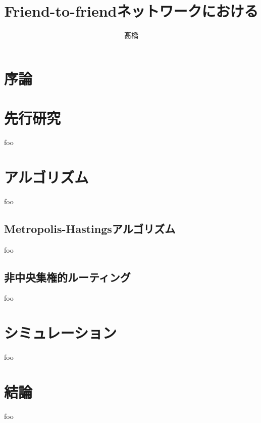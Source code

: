 \documentclass[dvipdfmx]{ampbt}
\title{Friend-to-friendネットワークにおける} %
      {効率的な非中央集権的ルーティング}                         %
      {}                                         %
\author{髙橋}{彰}             %
\begin{document}
\ifoutputbody
\makeinsidecover                %
\makeabstract                   %
\maketoc                        %
\setcounter{page}{1}            %
\section{序論}
\cite{clarke2001freenet}
\cite{sandberg2006distributed}
\cite{sandberg2006evolution}
\cite{sandberg2008neighbor}
\cite{mogren2008adaptive}
\cite{evans2007routing}
\cite{clarke2010private}
\cite{schiller2011attack}
\cite{roos2012provable}
\cite{roos2013contribution}
\cite{roos2016dealing}
\cite{hofer2013greedy}
\cite{roos2016anonymous}
\cite{roos2016analyzing}
\cite{kleinberg2000small}
\cite{csimcsek2008navigating}
\cite{serrano2008self}
\cite{boguna2009navigating}
\cite{boguna2009navigability}
\cite{kleinberg2007geographic}
\cite{cvetkovski2009hyperbolic}
\cite{krioukov2010hyperbolic}
\cite{boguna2010sustaining}
\cite{papadopoulos2015network}
\cite{blasius2016efficient}
\cite{kleinberg2006complex}
\cite{huang2014navigation}

\section{先行研究}
foo
\section{アルゴリズム}
foo
\subsection{Metropolis-Hastingsアルゴリズム}
foo

\subsection{非中央集権的ルーティング}
foo
\section{シミュレーション}
foo
\section{結論}
foo
\acknowledgment
\end{document}
